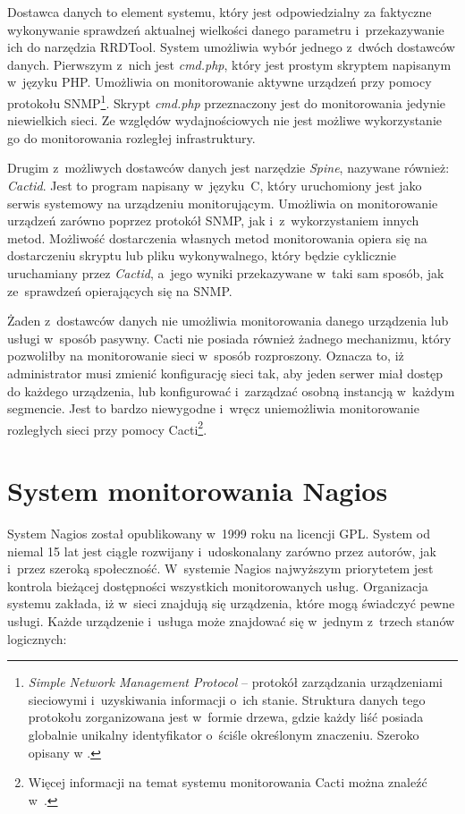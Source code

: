 Dostawca danych to element systemu, który jest odpowiedzialny za
faktyczne wykonywanie sprawdzeń aktualnej wielkości danego parametru
i~przekazywanie ich do narzędzia RRDTool. System umożliwia wybór
jednego z~dwóch dostawców danych. Pierwszym z~nich jest {\em cmd.php},
który jest prostym skryptem napisanym w~języku PHP. Umożliwia on
monitorowanie aktywne urządzeń przy pomocy protokołu SNMP\footnote{
  {\em Simple Network Management Protocol} -- protokół zarządzania
  urządzeniami sieciowymi i~uzyskiwania informacji o~ich
  stanie. Struktura danych tego protokołu zorganizowana jest w~formie
  drzewa, gdzie każdy liść posiada globalnie unikalny identyfikator
  o~ściśle określonym znaczeniu. Szeroko opisany w
  \cite{www:SNMP}.}. Skrypt {\em cmd.php} przeznaczony jest do
monitorowania jedynie niewielkich sieci. Ze względów wydajnościowych
nie jest możliwe wykorzystanie go do monitorowania rozległej
infrastruktury.

Drugim z~możliwych dostawców danych jest narzędzie {\em Spine},
nazywane również: {\em Cactid}. Jest to program napisany w~języku~C,
który uruchomiony jest jako serwis systemowy na urządzeniu
monitorującym. Umożliwia on monitorowanie urządzeń zarówno poprzez
protokół SNMP, jak i~z~wykorzystaniem innych metod. Możliwość
dostarczenia własnych metod monitorowania opiera się na dostarczeniu
skryptu lub pliku wykonywalnego, który będzie cyklicznie uruchamiany
przez {\em Cactid}, a~jego wyniki przekazywane w~taki sam sposób, jak
ze~sprawdzeń opierających się na SNMP.

Żaden z~dostawców danych nie umożliwia monitorowania danego urządzenia
lub usługi w~sposób pasywny. Cacti nie posiada również żadnego
mechanizmu, który pozwoliłby na monitorowanie sieci w~sposób
rozproszony. Oznacza to, iż administrator musi zmienić konfigurację
sieci tak, aby jeden serwer miał dostęp do każdego urządzenia, lub
konfigurować i~zarządzać osobną instancją w~każdym segmencie. Jest to
bardzo niewygodne i~wręcz uniemożliwia monitorowanie rozległych sieci
przy pomocy Cacti\footnote{Więcej informacji na temat systemu
  monitorowania Cacti można znaleźć w~\cite{www:Cacti}.}.

\section[Nagios][System monitorowania Nagios]{System monitorowania Nagios}

System Nagios został opublikowany w~1999 roku na licencji GPL. System
od niemal 15 lat jest ciągle rozwijany i~udoskonalany zarówno przez
autorów, jak i~przez szeroką społeczność. W~systemie Nagios najwyższym
priorytetem jest kontrola bieżącej dostępności wszystkich
monitorowanych usług. Organizacja systemu zakłada, iż w~sieci znajdują
się urządzenia, które mogą świadczyć pewne usługi. Każde urządzenie
i~usługa może znajdować się w~jednym z~trzech stanów logicznych:

